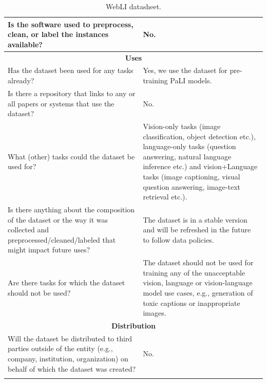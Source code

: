 \begin{longtable}[c]{ p{} | p{} }
Is the software used to preprocess, clean, or label the instances available? & No. \\ \toprule
\multicolumn{2}{c}{\textbf{Uses}}      \\ \toprule
Has the dataset been used for any tasks already? & Yes, we use the dataset for pre-training PaLI models. \\ \midrule
Is there a repository that links to any or all papers or systems that use the dataset? & No. \\ \midrule
What (other) tasks could the dataset be used for? & Vision-only tasks (image classification, object detection etc.), language-only tasks (question answering, natural language inference etc.) and vision+Language tasks (image captioning, visual question answering, image-text retrieval etc.). \\ \midrule
Is there anything about the composition of the dataset or the way it was collected and preprocessed/cleaned/labeled that might impact future uses? & The dataset is in a stable version and will be refreshed in the future to follow data policies. \\ \midrule
Are there tasks for which the dataset should not be used? & The dataset should not be used for training any of the unacceptable vision, language or vision-language model use cases, e.g., generation of toxic captions or inappropriate images. \\ \toprule
\multicolumn{2}{c}{\textbf{Distribution}}      \\ \toprule
Will the dataset be distributed to third parties outside of the entity (e.g., company, institution, organization) on behalf of which the dataset was created? & No. \\
\bottomrule
\caption{WebLI datasheet.}
\label{table:datasheet}
\end{longtable}